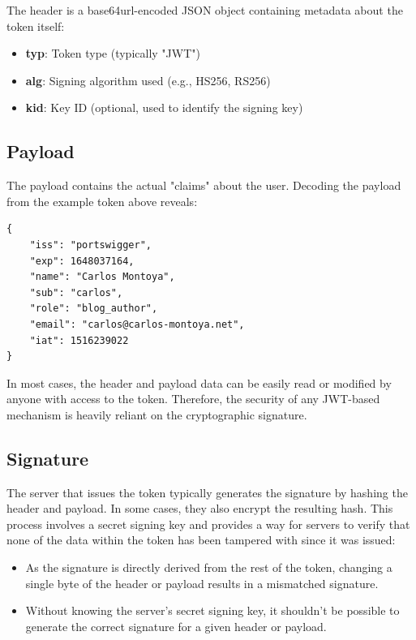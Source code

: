 \documentclass{article}
\begin{document}
The header is a base64url-encoded JSON object containing metadata about the token itself:

\begin{itemize}
    \item \textbf{typ}: Token type (typically "JWT")
    \item \textbf{alg}: Signing algorithm used (e.g., HS256, RS256)
    \item \textbf{kid}: Key ID (optional, used to identify the signing key)
\end{itemize}

\subsection{Payload}

The payload contains the actual "claims" about the user. Decoding the payload from the 
example token above reveals:

\begin{lstlisting}[caption=Decoded JWT Payload]
{
    "iss": "portswigger",
    "exp": 1648037164,
    "name": "Carlos Montoya",
    "sub": "carlos",
    "role": "blog_author",
    "email": "carlos@carlos-montoya.net",
    "iat": 1516239022
}
\end{lstlisting}

\begin{notebox}
In most cases, the header and payload data can be easily read or modified by anyone 
with access to the token. Therefore, the security of any JWT-based mechanism is heavily 
reliant on the cryptographic signature.
\end{notebox}

\subsection{Signature}

The server that issues the token typically generates the signature by hashing the header 
and payload. In some cases, they also encrypt the resulting hash. This process involves 
a secret signing key and provides a way for servers to verify that none of the data 
within the token has been tampered with since it was issued:

\begin{itemize}
    \item As the signature is directly derived from the rest of the token, changing a 
          single byte of the header or payload results in a mismatched signature.
    \item Without knowing the server's secret signing key, it shouldn't be possible to 
          generate the correct signature for a given header or payload.
\end{itemize}
\end{document}
